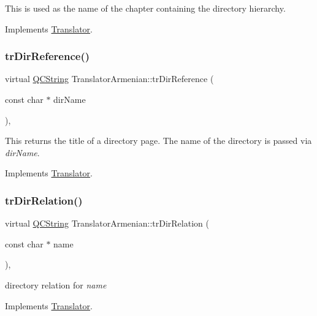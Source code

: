 This is used as the name of the chapter containing the directory hierarchy. 

Implements \mbox{\hyperlink{class_translator}{Translator}}.

\mbox{\label{class_translator_armenian_acd42ab9f607f4a3c81250717a1fe2564}} 
\subsubsection{\texorpdfstring{trDirReference()}{trDirReference()}}
{\footnotesize\ttfamily virtual \mbox{\hyperlink{class_q_c_string}{Q\+C\+String}} Translator\+Armenian\+::tr\+Dir\+Reference (\begin{DoxyParamCaption}\item[{const char $\ast$}]{dir\+Name }\end{DoxyParamCaption})\hspace{0.3cm}{\ttfamily [inline]}, {\ttfamily [virtual]}}

This returns the title of a directory page. The name of the directory is passed via {\itshape dir\+Name}. 

Implements \mbox{\hyperlink{class_translator}{Translator}}.

\mbox{\label{class_translator_armenian_adb2b1adbbc6f9f6e0f9a233cd512a5a4}} 
\subsubsection{\texorpdfstring{trDirRelation()}{trDirRelation()}}
{\footnotesize\ttfamily virtual \mbox{\hyperlink{class_q_c_string}{Q\+C\+String}} Translator\+Armenian\+::tr\+Dir\+Relation (\begin{DoxyParamCaption}\item[{const char $\ast$}]{name }\end{DoxyParamCaption})\hspace{0.3cm}{\ttfamily [inline]}, {\ttfamily [virtual]}}

directory relation for {\itshape name} 

Implements \mbox{\hyperlink{class_translator}{Translator}}.

